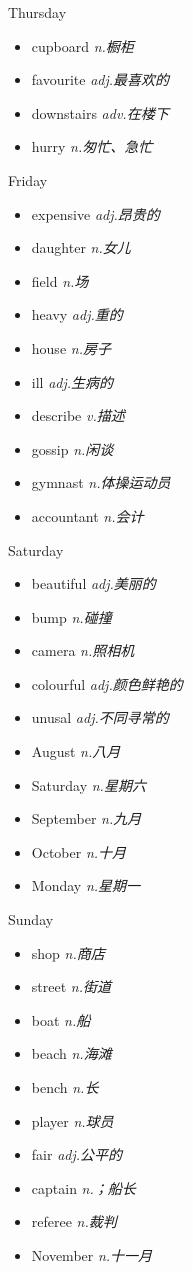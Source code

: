 \documentclass{ctexart}
\begin{document}
\begin{multicols}{2}
\begin{textbox}{Thursday}
\begin{itemize}
\item cupboard \emph{n.橱柜}
\item favourite \emph{adj.最喜欢的}
\item downstairs \emph{adv.在楼下}
\item hurry \emph{n.匆忙、急忙}
\end{itemize}
\end{textbox}
\begin{textbox}{Friday}
\begin{itemize}
\item expensive \emph{adj.昂贵的}
\item daughter \emph{n.女儿}
\item field \emph{n.场}
\item heavy \emph{adj.重的}
\item house \emph{n.房子}
\item ill \emph{adj.生病的}
\item describe \emph{v.描述}
\item gossip \emph{n.闲谈}
\item gymnast \emph{n.体操运动员}
\item accountant \emph{n.会计}
\end{itemize}
\end{textbox}
\begin{textbox}{Saturday}
\begin{itemize}
\item beautiful \emph{adj.美丽的}
\item bump \emph{n.碰撞}
\item camera \emph{n.照相机}
\item colourful \emph{adj.颜色鲜艳的}
\item unusal \emph{adj.不同寻常的}
\item August \emph{n.八月}
\item Saturday \emph{n.星期六}
\item September \emph{n.九月}
\item October \emph{n.十月}
\item Monday \emph{n.星期一}
\end{itemize}
\end{textbox}
\begin{textbox}{Sunday}
\begin{itemize}
\item shop \emph{n.商店}
\item street \emph{n.街道}
\item boat \emph{n.船}
\item beach \emph{n.海滩}
\item bench \emph{n.长}
\item player \emph{n.球员}
\item fair \emph{adj.公平的}
\item captain \emph{n.；船长}
\item referee \emph{n.裁判}
\item November \emph{n.十一月}
\end{itemize}
\end{textbox}
\end{multicols}
\end{document}
